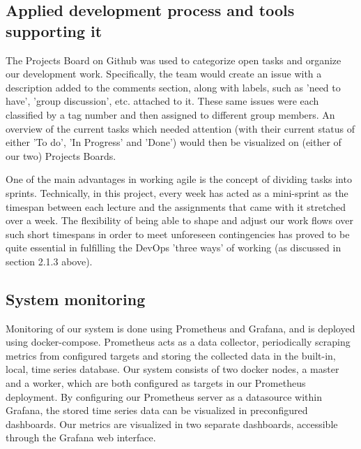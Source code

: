 \subsection{Applied development process and tools supporting it}
The Projects Board on Github was used to categorize open tasks and organize our development work. Specifically, the team would create an issue with a description added to the comments section, along with labels, such as 'need to have', 'group discussion', etc. attached to it. These same issues were each classified by a tag number and then assigned to different group members. An overview of the current tasks which needed attention (with their current status of either 'To do', 'In Progress' and 'Done') would then be visualized on (either of our two) Projects Boards.

One of the main advantages in working agile is the concept of dividing tasks into sprints. 
Technically, in this project, every week has acted as a mini-sprint as the timespan between each lecture and the assignments that came with it stretched over a week. 
The flexibility of being able to shape and adjust our work flows over such short timespans in order to meet unforeseen contingencies has proved to be quite essential in fulfilling the DevOps 'three ways' of working (as discussed in section 2.1.3 above).  

  
\subsection{System monitoring}
Monitoring of our system is done using Prometheus and Grafana, and is deployed using docker-compose. \newline
Prometheus acts as a data collector, periodically scraping metrics from configured targets and storing the collected data in the built-in, local, time series database.\newline
Our system consists of two docker nodes, a master and a worker, which are both configured as targets in our Prometheus deployment.\newline
By configuring our Prometheus server as a datasource within Grafana, the stored time series data can be visualized in preconfigured dashboards. Our metrics are visualized in two separate dashboards, accessible through the Grafana web interface.

